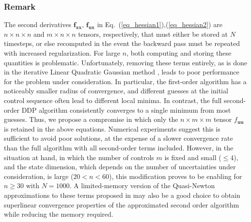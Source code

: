 \documentclass[journal ]{new-aiaa}
\newcommand{\state}{\ensuremath{\mathbf{x}}}
\newcommand{\control}{\ensuremath{\mathbf{u}}}
\begin{document}
\subsubsection*{Remark} The second derivatives $\mathbf{f}_{\state\state},\, \mathbf{f}_{\control\state}$ in Eq.~(\ref{eq_hessian1}),(\ref{eq_hessian2}) are $n\times n\times n$ and $m\times n\times n$ tensors, respectively, that must either be stored at $N$ timesteps, or else recomputed in the event the backward pass must be repeated with increased regularization. For large $n$, both computing and storing these quantities is problematic. Unfortunately, removing these terms entirely, as is done in the iterative Linear Quadratic Gaussian method \cite{iLQG}, leads to poor performance for the problem under consideration. In particular, the first-order algorithm has a noticeably smaller radius of convergence, and different guesses at the initial control sequence often lead to different local minima. In contrast, the full second-order DDP algorithm consistently converges to a single minimum from most guesses. Thus, we propose a compromise in which only the $n\times m \times m$ tensor $f_{\control\control}$ is retained in the above equations. Numerical experiments suggest this is sufficient to avoid poor solutions, at the expense of a slower convergence rate than the full algorithm with all second-order terms included. However, in the situation at hand, in which the number of controls $m$ is fixed and small ($ \le4 $), and the state dimension, which depends on the number of uncertainties under consideration, is large ($20 < n <60$), this modification proves to be enabling for $n\ge 30$ with $N=1000$. A limited-memory version of the Quasi-Newton approximations to these terms proposed in \cite{QNDDP} may also be a good choice to obtain superlinear convergence properties of the approximated second order algorithm while reducing the memory required. 
\end{document}
